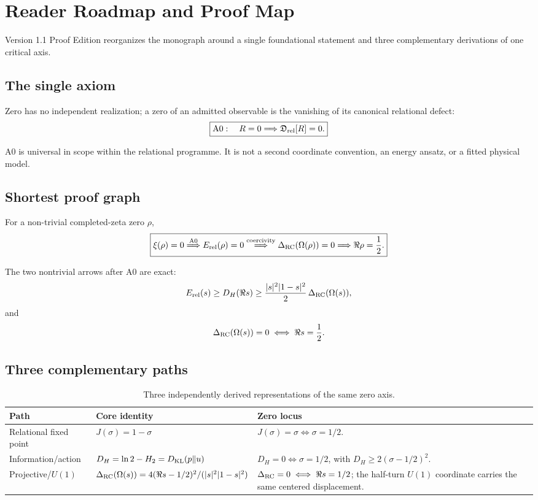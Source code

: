 \chapter*{Reader Roadmap and Proof Map}
\label{front:roadmap}

Version 1.1 Proof Edition reorganizes the monograph around a single foundational statement
and three complementary derivations of one critical axis.

\section*{The single axiom}

Zero has no independent realization; a zero of an admitted observable is the
vanishing of its canonical relational defect:
\[
\boxed{
\mathrm{A0}:\quad
R=0\Longrightarrow\mathfrak D_{\rm rel}[R]=0.
}
\]

A0 is universal in scope within the relational programme.  It is not a second
coordinate convention, an energy ansatz, or a fitted physical model.

\section*{Shortest proof graph}

For a non-trivial completed-zeta zero \(\rho\),
\[
\boxed{
\xi(\rho)=0
\stackrel{\mathrm{A0}}{\Longrightarrow}
E_{\rm rel}(\rho)=0
\stackrel{\rm coercivity}{\Longrightarrow}
\Delta_{\rm RC}(\Omega(\rho))=0
\Longrightarrow
\Re\rho=\frac12.
}
\]

The two nontrivial arrows after A0 are exact:
\[
E_{\rm rel}(s)
\ge
D_H(\Re s)
\ge
\frac{|s|^2|1-s|^2}{2}\,
\Delta_{\rm RC}(\Omega(s)),
\]
and
\[
\Delta_{\rm RC}(\Omega(s))=0
\iff
\Re s=\frac12.
\]

\section*{Three complementary paths}

\begin{table}[htbp]
\centering\small
\begin{tabular}{p{}p{}p{}}
\toprule
Path & Core identity & Zero locus\\
\midrule
Relational fixed point &
\(J(\sigma)=1-\sigma\) &
\(J(\sigma)=\sigma\iff\sigma=1/2\).\\
Information/action &
\(D_H=\ln2-H_2=D_{\rm KL}(p\|u)\) &
\(D_H=0\iff\sigma=1/2\), with
\(D_H\ge2(\sigma-1/2)^2\).\\
Projective/\(U(1)\) &
\(\Delta_{\rm RC}(\Omega(s))
=4(\Re s-1/2)^2/(|s|^2|1-s|^2)\) &
\(\Delta_{\rm RC}=0\iff\Re s=1/2\);
the half-turn \(U(1)\) coordinate carries the same centered displacement.\\
\bottomrule
\end{tabular}
\caption{Three independently derived representations of the same zero axis.}
\label{tab:zero-axis-three-paths}
\end{table}

